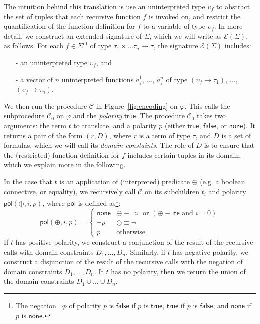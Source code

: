 \documentclass[runningheads,a4paper]{llncs}
\newcommand{\con}[1]{\mathsf{#1}}
\newcommand{\teq}{\approx}
\newcommand{\conv}{\mathcal{C}}
\newcommand{\sfundefs}[1]{#1^\mathrm{df}}
\newcommand{\pnone}{\con{none}}
\newcommand{\ptrue}{\con{true}}
\newcommand{\pfalse}{\con{false}}
\newcommand{\pol}{\con{pol}}
\newcommand{\lite}{\con{ite}}
\newcommand{\boolop}{\oplus}
\newcommand{\farg}[1]{a_{#1}}
\newcommand{\fargsort}[1]{\upsilon_{#1}}
\newcommand{\extendsig}[1]{\mathcal{E}( #1 )}
\begin{document}
The intuition behind this translation is use an uninterpreted type $\fargsort{f}$ to abstract the set of tuples that each recursive function $f$ is invoked on,
and restrict the quantification of the function definition for $f$ to a variable of type $\fargsort{f}$.
In more detail, we construct an extended signature of $\Sigma$, which we will write as $\extendsig{\Sigma}$, as follows.
For each $f \in \sfundefs{\Sigma}$ of type $\tau_1 \times \ldots \tau_n \rightarrow \tau$, 
the signature $\extendsig{\Sigma}$ includes:
\begin{enumerate}
\item[-] an uninterpreted type $\fargsort{f}$, and
\item[-] a vector of $n$ uninterpreted functions $\farg{f}^1$, $\ldots$, $\farg{f}^n$ of type $(\fargsort{f} \rightarrow \tau_1)$, $\ldots$, $(\fargsort{f} \rightarrow \tau_n)$.
\end{enumerate}
We then run the procedure $\conv$ in Figure~\ref{fig:encoding} on $\varphi$.
This calls the subprocedure $\conv_0$ on $\varphi$ and the \emph{polarity} $\ptrue$.
The procedure $\conv_0$ takes two arguments: the term $t$ to translate, and a polarity $p$ (either $\ptrue$, $\pfalse$, or $\pnone$).
It returns a pair of the form $( r, D )$, where $r$ is a term of type $\tau$, and $D$ is a set of formulas, which we will call its \emph{domain constaints}.
The role of $D$ is to ensure that the (restricted) function definition for $f$ includes certain tuples in its domain, which we explain more in the following.

In the case that $t$ is an application of (interpreted) predicate $\boolop$ (e.g. a boolean connective, or equality),
we recursively call $\conv$ on its subchildren $t_i$ and polarity $\pol( \boolop, i, p )$, where $\pol$ is defined as\footnote{The negation $\neg p$ of polarity $p$ is 
$\pfalse$ if $p$ is $\ptrue$,
$\ptrue$ if $p$ is $\pfalse$, and
$\pnone$ if $p$ is $\pnone$.}:
\begin{equation*}
\pol( \boolop, i, p ) = \begin{cases}
                         \pnone & \boolop \equiv \teq \text{ or } ( \boolop \equiv \lite \text{ and } i=0 ) \\
                         \neg p & \boolop \equiv \neg \\
                         p & \text{otherwise}
                         \end{cases}
\end{equation*}
If $t$ has positive polarity,
we construct a conjunction of the result of the recursive calls with domain constraints $D_1, \ldots, D_n$.
Similarly, if $t$ has negative polarity,
we construct a disjunction of the result of the recursive calls with the negation of domain constraints $D_1, \ldots, D_n$.
It $t$ has no polarity,
then we return the union of the domain constraints $D_1 \cup \ldots \cup D_n$.
\end{document}
